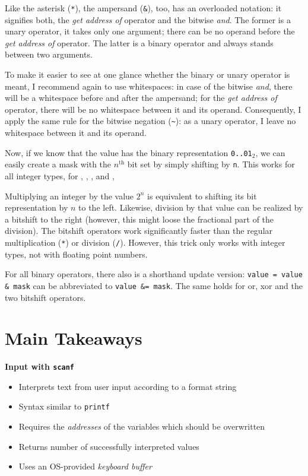 {\begin{hintbox}
Like the asterisk (\texttt{*}), the ampersand (\texttt{\&}), too, has an overloaded notation: it signifies both, the \emph{get address of} operator and the bitwise \emph{and}. The former is a unary operator, \ie it takes only one argument; there can be no operand before the \emph{get address of} operator. The latter is a binary operator and always stands between two arguments.

To make it easier to see at one glance whether the binary or unary operator is meant, I recommend again to use whitespaces: in case of the bitwise \emph{and}, there will be a whitespace before and after the ampersand; for the \emph{get address of} operator, there will be no whitespace between it and its operand. Consequently, I apply the same rule for the bitwise negation (\texttt{\textasciitilde}): as a unary operator, I leave no whitespace between it and its operand.
\end{hintbox}

Now, if we know that the value  has the binary representation \texttt{0..01$_2$}, we can easily create a mask with the $n^{\text{th}}$ bit set by simply shifting  by \texttt{n}. This works for all integer types, \ie for , , ,  and , 

\begin{hintbox}
Multiplying an integer by the value $2^n$ is equivalent to shifting its bit representation by $n$ to the left. Likewise, division by that value can be realized by a bitshift to the right (however, this might loose the fractional part of the division). The bitshift operators work significantly faster than the regular multiplication (\texttt{*}) or division (\texttt{/}). However, this trick only works with integer types, not with floating point numbers.
\end{hintbox}

For all binary operators, there also is a shorthand update version: \texttt{value = value \& mask} can be abbreviated to \texttt{value \&= mask}. The same holds for or, xor and the two bitshift operators.


\section{Main Takeaways}
\begin{defbox}
\textbf{Input with \texttt{scanf}}
\begin{itemize}
\item Interprets text from user input according to a format string
\item Syntax similar to \texttt{printf}
\item Requires the \emph{addresses} of the variables which should be overwritten
\item Returns number of successfully interpreted values
\item Uses an OS-provided \emph{keyboard buffer}
\end{itemize}


\end{defbox}}
